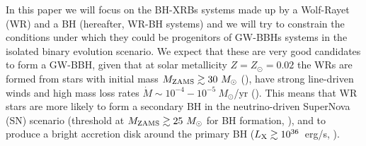 \documentclass[a4paper,titlepage]{book}     	%
\newcommand{\sun}{\ensuremath{_\odot}}
\newcommand{\mzams}{M_\textup{ZAMS}}
\newcommand{\mdot}{\ensuremath{\dot{M}}}
\newcommand{\msun}{\ensuremath{M\sun}}
\newcommand{\zsun}{\ensuremath{Z\sun}}
\begin{document}
In this paper we will focus on the BH-XRBs systems made up by a Wolf-Rayet (WR) and a BH (hereafter, WR-BH systems) and we will try to constrain the conditions under which they could be progenitors of GW-BBHs systems in the isolated binary evolution scenario. We expect that these are very good candidates to form a GW-BBH, given that at solar metallicity $Z=\zsun=0.02$ the WRs are formed from stars with initial mass $\mzams \gtrsim 30~\msun$ (\cite{Limongi2010_preSNevo}), have strong line-driven winds and high mass loss rates $\mdot \sim 10^{-4}-10^{-5}~\msun$/yr (\cite{G&H_WRmassloss}). This means that WR stars are more likely to form a secondary BH in the neutrino-driven SuperNova (SN) scenario (threshold at $\mzams \gtrsim 25~\msun$ for BH formation, \cite{Sukhbold2016_stellarevo}), and to produce a bright accretion disk around the primary BH ($L_\textup{X} \gtrsim 10^{36}$~erg/s, \cite{Tutukov2013_WRBHreview}).


















\end{document}
